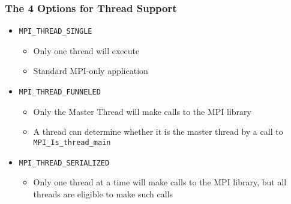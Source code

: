 \begin{frame}[fragile]
\frametitle{The 4 Options for Thread Support}


\begin{itemize}
\item \verb+MPI_THREAD_SINGLE+
\begin{itemize}
\item Only one thread will execute
\item Standard MPI-only application
\end{itemize}
\item \verb+MPI_THREAD_FUNNELED+
\begin{itemize}
\item Only the Master Thread will make calls to the MPI library
\item A thread can determine whether it is the master thread by a call to \verb+MPI_Is_thread_main+
\end{itemize}
\item \verb+MPI_THREAD_SERIALIZED+
\begin{itemize}
\item Only one thread at a time will make calls to the MPI library, but all threads are eligible to make such calls
\end{itemize}
\end{itemize}

\end{frame}


